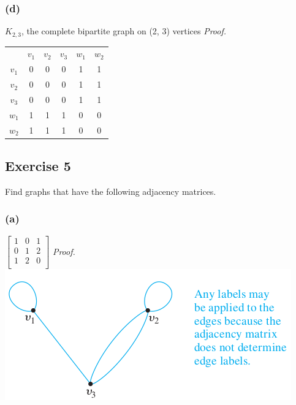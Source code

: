 \documentclass[14pt]{extarticle}
\newcommand{\cy}{\color{cyan}}
\begin{document}
\subsubsection{(d)}
\(K_{2,3}\), the complete bipartite graph on (2, 3) vertices
    {\it Proof.}
\begin{tabular}{cccccc}
                  & {\cy \(v_1\)} & {\cy \(v_2\)} & {\cy \(v_3\)} & {\cy \(w_1\)} & {\cy \(w_2\)} \\
    {\cy \(v_1\)} & 0             & 0             & 0             & 1             & 1             \\
    {\cy \(v_2\)} & 0             & 0             & 0             & 1             & 1             \\
    {\cy \(v_3\)} & 0             & 0             & 0             & 1             & 1             \\
    {\cy \(w_1\)} & 1             & 1             & 1             & 0             & 0             \\
    {\cy \(w_2\)} & 1             & 1             & 1             & 0             & 0             \\
\end{tabular}

\subsection{Exercise 5}
Find graphs that have the following adjacency matrices.

\subsubsection{(a)}
\(
\left[
    \begin{array}{ccc}
        1 & 0 & 1 \\
        0 & 1 & 2 \\
        1 & 2 & 0 \\
    \end{array}
    \right]
\)
{\it Proof.} \includegraphics[scale=0.6]{../images/10.2.5.a.png}
\end{document}

